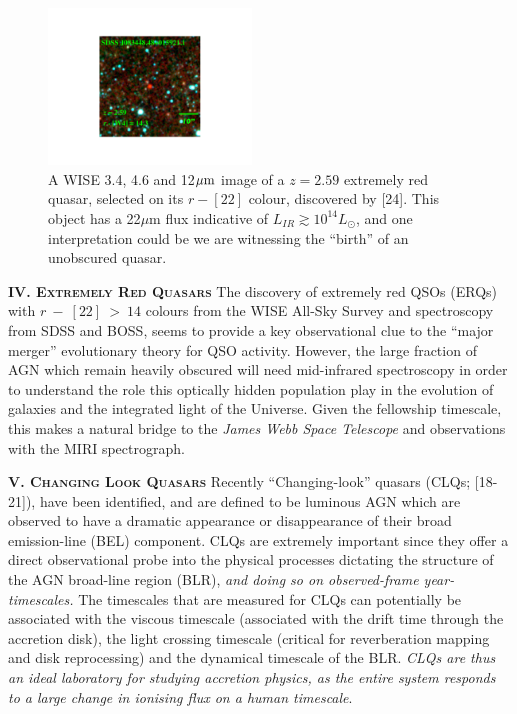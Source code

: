 \documentclass[11pt,epsf]{article}
\begin{document}
\medskip
\medskip
\begin{figure}
  \begin{center}
    \includegraphics[width=0.48\textwidth]{SDSS_J083448_ERQ.pdf}
  \end{center}
  \caption{\small 
    A WISE 3.4, 4.6 and 12$\mu {\rm m}$ image of a $z=2.59$ extremely red
    quasar, selected on its $r-[22]$ colour, discovered by [24].  This
    object has a 22$\mu$m flux indicative of $L_{IR} \gtrsim 10^{14}
    L_{\odot}$, and one interpretation could be we are witnessing the
    ``birth'' of an unobscured quasar.}
\end{figure}

\smallskip
\smallskip
\noindent
\textbf{\textsc{IV. Extremely Red Quasars}} 
The discovery of extremely red QSOs (ERQs) with $r~-~[22]~>~14$
colours from the WISE All-Sky Survey and spectroscopy from SDSS and
BOSS, seems to provide a key observational clue to the ``major
merger'' evolutionary theory for QSO activity.  However, the large
fraction of AGN which remain heavily obscured will need mid-infrared
spectroscopy in order to understand the role this optically hidden
population play in the evolution of galaxies and the integrated light
of the Universe. Given the fellowship timescale, this makes a natural
bridge to the {\it James Webb Space Telescope} and observations with
the MIRI spectrograph.


\medskip
\medskip

\smallskip
\smallskip
\noindent
\textbf{\textsc{V. Changing Look Quasars}} 
Recently ``Changing-look'' quasars (CLQs; [18-21]), have been
identified, and are defined to be luminous AGN which are observed to
have a dramatic appearance or disappearance of their broad
emission-line (BEL) component. CLQs are extremely important since they
offer a direct observational probe into the physical processes
dictating the structure of the AGN broad-line region (BLR), {\it and doing
so on observed-frame year-timescales.} The timescales that are measured for CLQs can potentially be associated with the viscous
timescale (associated with the drift time through the
accretion disk), the light crossing timescale (critical for
reverberation mapping and disk reprocessing) and the dynamical
timescale of the BLR.  {\it CLQs are thus an ideal laboratory for studying
accretion physics, as the entire system responds to a large change in
ionising flux on a human timescale}.
\end{document}
